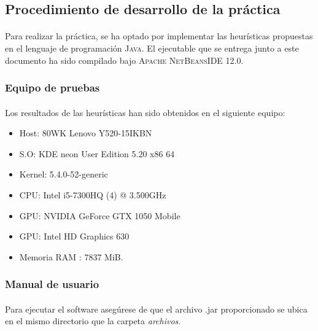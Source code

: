 \documentclass{article}
\begin{document}
	\subsection{Procedimiento de desarrollo de la práctica}
	
	\paragraph{}Para realizar la práctica, se ha optado por implementar las heurísticas propuestas en el lenguaje de programación \textsc{Java}. El ejecutable que se entrega junto a este documento ha sido compilado bajo \textsc{ Apache NetBeansIDE 12.0}.
	
	\subsubsection{Equipo de pruebas}
	
	\paragraph{}Los resultados de las heurísticas han sido obtenidos en el siguiente equipo:
	
	\begin{itemize}
		
		\item Host: 80WK Lenovo Y520-15IKBN
		\item S.O: KDE neon User Edition 5.20 x86 64
		\item Kernel: 5.4.0-52-generic
		\item CPU: Intel i5-7300HQ (4) @ 3.500GHz
		\item GPU: NVIDIA GeForce GTX 1050 Mobile
		\item GPU: Intel HD Graphics 630
		\item Memoria RAM : 7837 MiB.
		
	\end{itemize}
	
	\subsubsection{Manual de usuario}
	
	\paragraph{}Para ejecutar el software asegúrese de que el archivo .jar proporcionado se ubica en el mismo directorio que la carpeta \emph{archivos}. 
	
\end{document}
